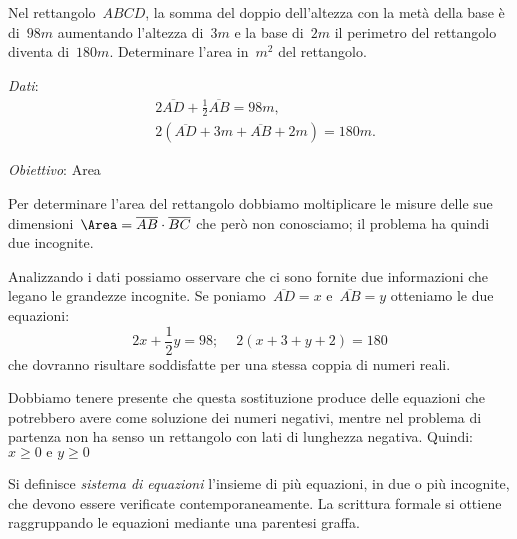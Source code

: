 \begin{problema}
\label{pr:22.1}
Nel rettangolo~\(ABCD\), la somma del doppio dell'altezza con la metà della base
è di~\(98\unit{m}\) aumentando l'altezza di~\(3\unit{m}\) e la base 
di~\(2\unit{m}\) 
il perimetro del rettangolo diventa di~\(180\unit{m}\). 
Determinare l'area in~\(\unit{m}^{2}\) del rettangolo.
\end{problema}
\begin{multicols}{2}
\emph{Dati}:
\begin{align*}
&2\overline{AD}+\frac{1}{2}\overline{AB}=98\unit{m},\\
&2(\overline{AD}+3m+\overline{AB}+2m)=180\unit{m}.
\end{align*}

\emph{Obiettivo}: Area

\begin{center}
\begin{inaccessibleblock}
%  
 \end{inaccessibleblock}
\end{center}
\end{multicols}

Per determinare l'area del rettangolo dobbiamo moltiplicare le misure 
delle sue dimensioni~\(\Area=\overline{AB}\cdot\overline{BC}\)
che però non conosciamo; il problema ha quindi due incognite.

Analizzando i dati possiamo osservare che ci sono fornite due
informazioni che legano le grandezze incognite. 
Se poniamo~\(\overline{AD}=x\) e~\(\overline{AB}=y\)
otteniamo le due equazioni:
\[2x+\frac{1}{2}y=98;\quad~2(x+3+y+2)=180\]
che dovranno risultare soddisfatte per una stessa coppia di numeri
reali.

\begin{osservazione}
 Dobbiamo tenere presente che questa sostituzione produce delle equazioni 
 che potrebbero avere come soluzione dei numeri negativi, mentre nel problema 
 di partenza non ha senso un rettangolo con lati di lunghezza negativa.
 Quindi:~\(x \geqslant 0 \text{ e } y \geqslant 0\)
\end{osservazione}

\begin{definizione}
Si definisce \emph{sistema di equazioni} l'insieme di più equazioni, 
in due o più incognite,
che devono essere verificate contemporaneamente. La scrittura formale
si ottiene raggruppando le equazioni mediante una parentesi graffa.
\end{definizione}

